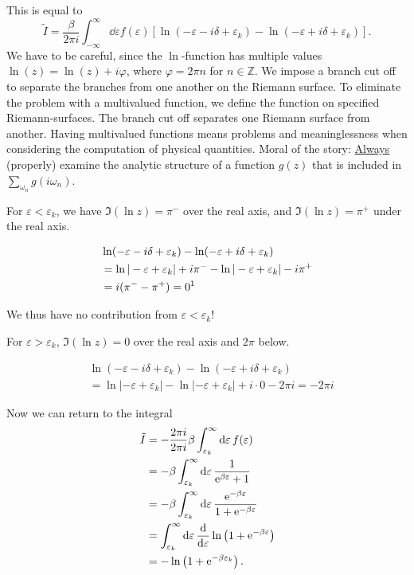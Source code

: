This is equal to 
\begin{equation}
\label{unc:is_it_really_equal}
\tilde{I} = \frac{\beta}{2\pi i}\int_{-\infty}^\infty\dd{\varepsilon}f(\varepsilon)\left[\ln(-\varepsilon -i\delta + \varepsilon_k) - \ln(-\varepsilon + i\delta + \varepsilon_k)\right].
\end{equation}
We have to be careful, since the $\ln$-function has multiple values $\ln(z) = \ln(z) + i\varphi$, where $\varphi = 2\pi n$ for $n \in \mathbb{Z}$. We impose a branch cut off to separate the branches from one another on the Riemann surface. To eliminate the problem with a multivalued function, we define the function on specified Riemann-surfaces. The branch cut off separates one Riemann surface from another. Having multivalued functions means problems and meaninglessness when considering the computation of physical quantities. Moral of the story: \underline{Always} (properly)
examine the analytic structure of a function $g(z)$ that is included in $\sum_{\omega_n}g(i\omega_n)$.

For $\varepsilon < \varepsilon_k$, we have \(\Im(\ln z) = \pi^-\) over the real axis, and \(\Im(\ln z) = \pi^+\) under the real axis. 

\begin{align}
&\ln (-\varepsilon -i\delta + \varepsilon_k) - \ln(-\varepsilon + i\delta+\varepsilon_k) \nonumber \\
&=\ln|-\varepsilon + \varepsilon_k| + i\pi^- - \ln|-\varepsilon + \varepsilon_k| - i\pi^+\nonumber \\
&= i(\pi^- - \pi^+) = 0 \text{\footnotemark}
\end{align}

We thus have no contribution from $\varepsilon <\varepsilon_k$!

For $\varepsilon>\varepsilon_k$, $\Im(\ln z) = 0$ over the real axis and $2\pi$ below. 

\begin{align}
&\ln (-\varepsilon -i\delta + \varepsilon_k) - \ln(-\varepsilon + i\delta+\varepsilon_k) \nonumber \\
&= \ln|-\varepsilon+ \varepsilon_k| - \ln|-\varepsilon + \varepsilon_k| + i\cdot 0 - 2\pi i = -2\pi i
\end{align}

Now we can return to the integral
\begin{align}
\tilde{I} &= -\frac{2\pi i}{2\pi i}\beta\int_{\varepsilon_k}^\infty\dd{\varepsilon}f(\varepsilon) \\
&= -\beta\int_{\varepsilon_k}^\infty\dd{\varepsilon}\frac{1}{\mathrm{e}^{\beta\varepsilon}+1} \\
&= -\beta\int_{\varepsilon_k}^\infty \dd{\varepsilon}\frac{\mathrm{e}^{-\beta\varepsilon}}{1+\mathrm{e}^{-\beta\varepsilon}} \\
&= \int_{\varepsilon_k}^\infty \dd{\varepsilon} \dv{\varepsilon}\ln\left( 1+\mathrm{e}^{-\beta\varepsilon}\right)\\
&= -\ln\left(1+\mathrm{e}^{-\beta\varepsilon_k}\right).
\end{align}

